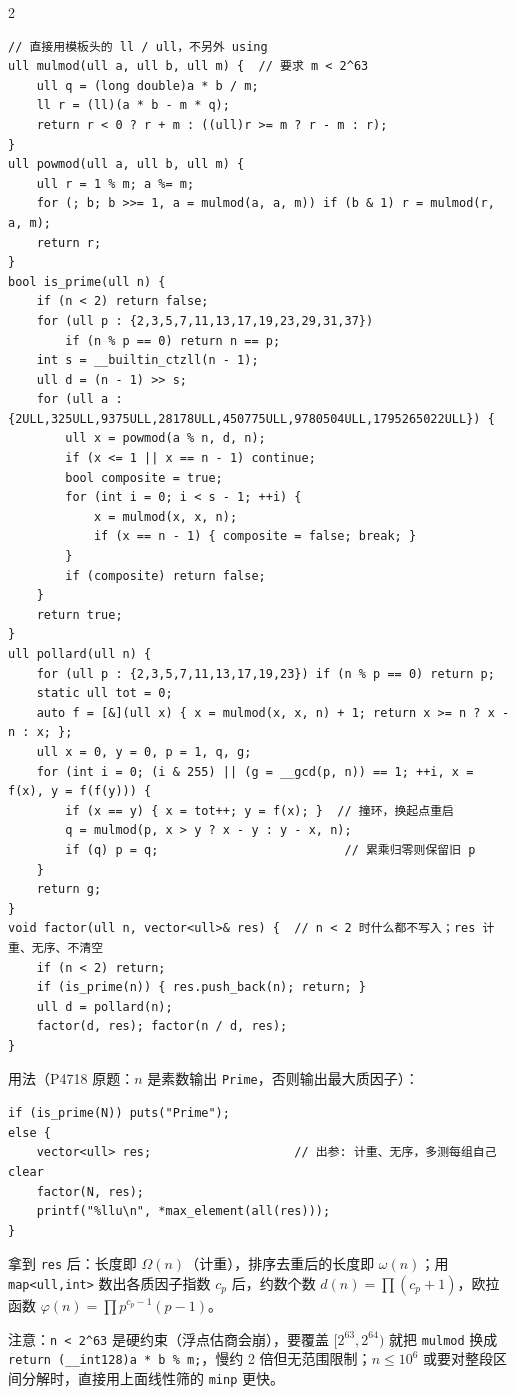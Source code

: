 \begin{multicols*}{2}
		\begin{verbatim}
// 直接用模板头的 ll / ull，不另外 using
ull mulmod(ull a, ull b, ull m) {  // 要求 m < 2^63
	ull q = (long double)a * b / m;
	ll r = (ll)(a * b - m * q);
	return r < 0 ? r + m : ((ull)r >= m ? r - m : r);
}
ull powmod(ull a, ull b, ull m) {
	ull r = 1 % m; a %= m;
	for (; b; b >>= 1, a = mulmod(a, a, m)) if (b & 1) r = mulmod(r, a, m);
	return r;
}
bool is_prime(ull n) {
	if (n < 2) return false;
	for (ull p : {2,3,5,7,11,13,17,19,23,29,31,37})
		if (n % p == 0) return n == p;
	int s = __builtin_ctzll(n - 1);
	ull d = (n - 1) >> s;
	for (ull a : {2ULL,325ULL,9375ULL,28178ULL,450775ULL,9780504ULL,1795265022ULL}) {
		ull x = powmod(a % n, d, n);
		if (x <= 1 || x == n - 1) continue;
		bool composite = true;
		for (int i = 0; i < s - 1; ++i) {
			x = mulmod(x, x, n);
			if (x == n - 1) { composite = false; break; }
		}
		if (composite) return false;
	}
	return true;
}
ull pollard(ull n) {
	for (ull p : {2,3,5,7,11,13,17,19,23}) if (n % p == 0) return p;
	static ull tot = 0;
	auto f = [&](ull x) { x = mulmod(x, x, n) + 1; return x >= n ? x - n : x; };
	ull x = 0, y = 0, p = 1, q, g;
	for (int i = 0; (i & 255) || (g = __gcd(p, n)) == 1; ++i, x = f(x), y = f(f(y))) {
		if (x == y) { x = tot++; y = f(x); }  // 撞环，换起点重启
		q = mulmod(p, x > y ? x - y : y - x, n);
		if (q) p = q;                          // 累乘归零则保留旧 p
	}
	return g;
}
void factor(ull n, vector<ull>& res) {  // n < 2 时什么都不写入；res 计重、无序、不清空
	if (n < 2) return;
	if (is_prime(n)) { res.push_back(n); return; }
	ull d = pollard(n);
	factor(d, res); factor(n / d, res);
}
		\end{verbatim}

		用法（P4718 原题：$n$ 是素数输出 \verb|Prime|，否则输出最大质因子）：

		\begin{verbatim}
if (is_prime(N)) puts("Prime");
else {
	vector<ull> res;					// 出参: 计重、无序，多测每组自己 clear
	factor(N, res);
	printf("%llu\n", *max_element(all(res)));
}
		\end{verbatim}

		拿到 \verb|res| 后：长度即 $\Omega(n)$（计重），排序去重后的长度即 $\omega(n)$；用 \verb|map<ull,int>| 数出各质因子指数 $c_p$ 后，约数个数 $d(n)=\prod (c_p+1)$，欧拉函数 $\varphi(n)=\prod p^{c_p-1}(p-1)$。

		注意：\verb|n < 2^63| 是硬约束（浮点估商会崩），要覆盖 $[2^{63}, 2^{64})$ 就把 \verb|mulmod| 换成 \verb|return (__int128)a * b % m;|，慢约 2 倍但无范围限制；$n \le 10^6$ 或要对整段区间分解时，直接用上面线性筛的 \verb|minp| 更快。


\end{multicols*}
